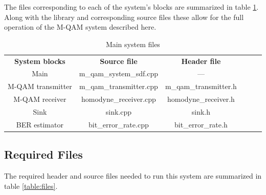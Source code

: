 The files corresponding to each of the system's blocks are summarized in table \ref{files_table}. Along with the library and corresponding source files these allow for the full operation of the M-QAM system described here.

\begin{table}[]
	\centering
	\label{files_table}
	\caption{Main system files}
	\begin{tabular}{|c|c|c|ccc}
		\cline{1-3}
		\textbf{System blocks} & \textbf{Source file} & \textbf{Header file}  &  \\ \cline{1-3}
		Main & m\_qam\_system\_sdf.cpp & --- &  \\ \cline{1-3}
		M-QAM transmitter & m\_qam\_transmitter.cpp & m\_qam\_transmitter.h &  \\ \cline{1-3}
		M-QAM receiver & homodyne\_receiver.cpp & homodyne\_receiver.h &   \\ \cline{1-3}
		Sink & sink.cpp & sink.h &   \\ \cline{1-3}
		BER estimator & bit\_error\_rate.cpp & bit\_error\_rate.h &  \\ \cline{1-3}
	\end{tabular}
\end{table}

\subsection*{Required Files}

The required header and source files needed to run this system are summarized in table \ref{table:files}.

